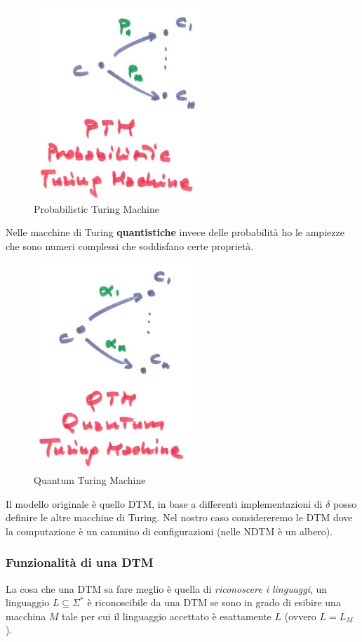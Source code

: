 \documentclass{article}
\begin{document}
\begin{figure}[H]
    \centering
    \includegraphics[scale=0.6]{images/PTM.png}
    \caption{Probabilistic Turing Machine}
\end{figure}
Nelle macchine di Turing \textbf{quantistiche} invece delle probabilità ho le ampiezze che sono
numeri complessi che soddisfano certe proprietà.
\begin{figure}[H]
    \centering
    \includegraphics[scale=0.6]{images/QTM.png}
    \caption{Quantum Turing Machine}
\end{figure}
Il modello originale è quello DTM, in base a differenti implementazioni di $\delta$ posso
definire le altre macchine di Turing. Nel nostro caso considereremo le DTM dove la computazione
è un cammino di configurazioni (nelle NDTM è un albero).
\subsubsection{Funzionalità di una DTM}
La cosa che una DTM sa fare meglio è quella di \textit{riconoscere i linguaggi},
un linguaggio $L\subseteq\Sigma^*$ è riconoscibile da una DTM se sono in grado di
esibire una macchina $M$ tale per cui il linguaggio accettato è esattamente $L$ (ovvero $L=L_M$).
\end{document}
